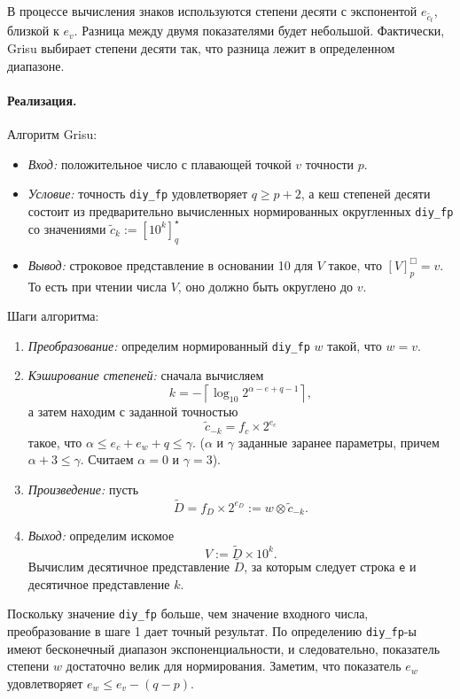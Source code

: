 В процессе вычисления знаков используются степени десяти с экспонентой $e_{\tilde{c_t}}$, близкой к $e_v$. 
Разница между двумя показателями будет небольшой.
Фактически, \textsf{Grisu} выбирает степени десяти так, что разница лежит в определенном диапазоне. 

\paragraph{Реализация.}
Алгоритм \textsf{Grisu}: \begin{itemize}
\item \textit{Вход:} положительное число с плавающей точкой $v$ точности $p$.
\item \textit{Условие:} точность \texttt{diy\_fp} удовлетворяет $q \geqslant p + 2$, а кеш степеней десяти состоит из предварительно вычисленных нормированных округленных  \texttt{diy\_fp} со значениями $\tilde{c}_k := \left[ 10^k \right]_q^{\star}$
\item \textit{Вывод:} строковое представление в основании 10 для $V$ такое, что $[V]^{\Box}_p = v$. 
То есть при чтении числа $V$, оно должно быть округлено до $v$.
\end{itemize}

Шаги алгоритма:
\begin{enumerate}
\item \textit{Преобразование:} определим нормированный \texttt{diy\_fp} $w$ такой, что $w = v$.
\item \textit{Кэширование степеней:} сначала вычисляем $$k = -\left\lceil \log_{10} {2^{\alpha -e+q-1}} \right\rceil,$$  а затем находим с заданной точностью $$\tilde{c}_{-k} = f_c \times 2^{e_c}$$ такое, что $\alpha \leqslant e_c + e_w + q \leqslant \gamma$. ($\alpha$ и $\gamma$ заданные заранее параметры, причем $\alpha + 3 \leqslant \gamma$. Считаем $\alpha=0$ и $\gamma=3$).
\item \textit{Произведение:} пусть $$\tilde{D} = f_D \times 2^{e_D} := w \otimes \tilde{c}_{-k}.$$
\item \textit{Выход:} определим искомое $$V := \tilde{D} \times 10^k.$$ 
Вычислим десятичное представление $\tilde{D}$, за которым следует строка \texttt{e} и десятичное представление $k$.
\end{enumerate}
Поскольку значение \texttt{diy\_fp} больше, чем значение входного числа, преобразование в шаге 1 дает точный результат. 
По определению \texttt{diy\_fp}-ы имеют бесконечный диапазон экспоненциальности, и следовательно, показатель степени $w$ достаточно велик для нормирования. 
Заметим, что показатель $e_w$ удовлетворяет $e_w \leqslant e_v - (q - p)$. 
 
